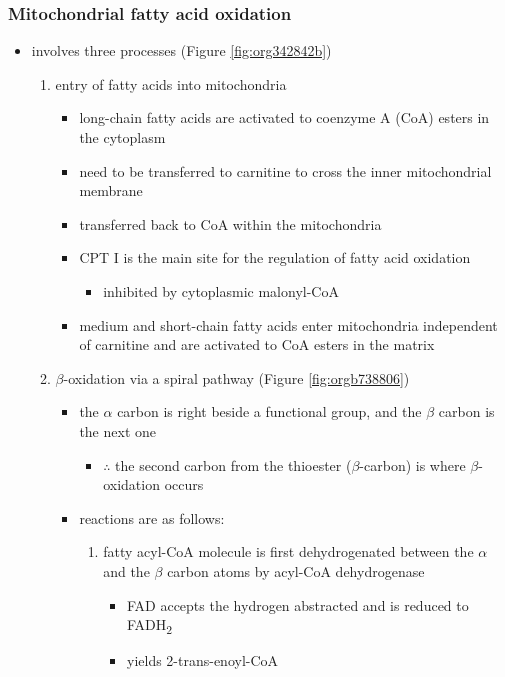 \documentclass{scrartcl}
\begin{document}
\subsubsection{Mitochondrial fatty acid oxidation}
\label{sec:org8417658}
\begin{itemize}
\item involves three processes (Figure \ref{fig:org342842b})
\begin{enumerate}
\item entry of fatty acids into mitochondria
\begin{itemize}
\item long-chain fatty acids are activated to coenzyme A (CoA) esters
in the cytoplasm
\item need to be transferred to carnitine to cross the inner
mitochondrial membrane
\item transferred back to CoA within the mitochondria
\item CPT I is the main site for the regulation of fatty acid
oxidation
\begin{itemize}
\item inhibited by cytoplasmic malonyl-CoA
\end{itemize}
\item medium and short-chain fatty acids enter mitochondria
independent of carnitine and are activated to CoA esters in the
matrix
\end{itemize}
\item \(\beta\)-oxidation via a spiral pathway (Figure \ref{fig:orgb738806})
\begin{itemize}
\item the \(\alpha\) carbon is right beside a functional group, and the
\(\beta\) carbon is the next one
\begin{itemize}
\item \(\therefore\) the second carbon from the thioester (\(\beta\)-carbon) is where
\(\beta\)-oxidation occurs
\end{itemize}
\item reactions are as follows:
\begin{enumerate}
\item fatty acyl-CoA molecule is first dehydrogenated between the \(\alpha\)
and the \(\beta\) carbon atoms by acyl-CoA dehydrogenase
\begin{itemize}
\item FAD accepts the hydrogen abstracted and is reduced to FADH\textsubscript{2}
\item yields 2-trans-enoyl-CoA
\end{itemize}

\end{enumerate}
\end{itemize}
\end{enumerate}
\end{itemize}
\end{document}
